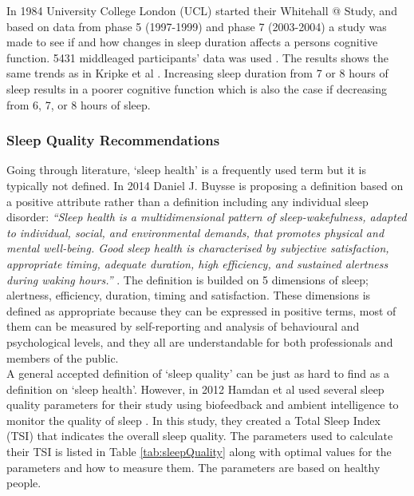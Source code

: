 \documentclass[12pt]{article} %
\makeatletter
\newcommand*{\rom}[1]{\expandafter\@slowromancap\romannumeral #1@}
\makeatother
\begin{document}
In 1984 University College London (UCL) started their Whitehall \rom{2} Study, and based on data from phase 5 (1997-1999) and phase 7 (2003-2004) a study was made to see if and how changes in sleep duration affects a persons cognitive function. 5431 middleaged participants' data was used \cite{cognitive}. The results shows the same trends as in Kripke et al \cite{arch}. Increasing sleep duration from 7 or 8 hours of sleep results in a poorer cognitive function which is also the case if decreasing from 6, 7, or 8 hours of sleep. 

\subsubsection{Sleep Quality Recommendations}
Going through literature, `sleep health' is a frequently used term but it is typically not defined. In 2014 Daniel J. Buysse is proposing a definition based on a positive attribute rather than a definition including any individual sleep disorder:
\textit{``Sleep health is a multidimensional pattern of sleep-wakefulness, adapted to individual, social, and environmental demands, that promotes physical and mental well-being. Good sleep health is characterised by subjective satisfaction, appropriate timing, adequate duration, high efficiency, and sustained alertness during waking hours.''} \cite{define}. 
The definition is builded on 5 dimensions of sleep; alertness, efficiency, duration, timing and satisfaction. These dimensions is defined as appropriate because they can be expressed in positive terms, most of them can be measured by self-reporting and analysis of behavioural and psychological levels, and they all are understandable for both professionals and members of the public. \\

A general accepted definition of `sleep quality' can be just as hard to find as a definition on `sleep health'. However, in 2012 Hamdan et al used several sleep quality parameters for their study using biofeedback and ambient intelligence to monitor the quality of sleep \cite{Hamdan2012ABS}. In this study, they created a Total Sleep Index (TSI) that indicates the overall sleep quality. The parameters used to calculate their TSI is listed in Table \ref{tab:sleepQuality} along with optimal values for the parameters and how to measure them. The parameters are based on healthy people. 
\end{document}
